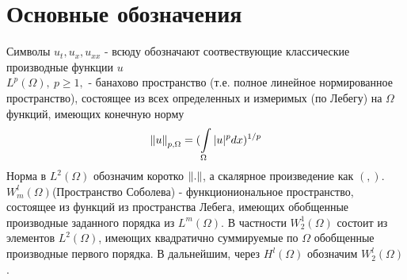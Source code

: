 \section*{Основные обозначения}
\vspace{1em}

Символы $u_t, u_x, u_{xx}$ - всюду обозначают соотвествующие классические
производные функции $u$\\

$L^{p}(\Omega), \ p \ge 1,$ - банахово пространство (т.е. полное линейное
нормированное пространство), состоящее из всех определенных и измеримых (по
Лебегу) на $\Omega$ функций, имеющих конечную норму
\begin{equation}
    \left\lVert u\right\rVert_{p, \Omega} = (\int\limits_{\Omega}{|u|^p dx})^{1/p}
\end{equation}
Норма в $L^2(\Omega)$ обозначим коротко $\left\lVert.\right\rVert$, а скалярное произведение
как $(, )$.\\

$W^l_m(\Omega)$(Пространство Соболева) - функциониональное пространство,
состоящее из функций из пространства Лебега, имеющих обобщенные производные 
заданного порядка из $L^m(\Omega)$. В частности
$W^1_2(\Omega)$ состоит из элементов $L^2(\Omega)$, имеющих квадратично
суммируемые по $\Omega$ обобщенные производные первого порядка. В дальнейшим,
через $H^l(\Omega)$ обозначим $W^l_2(\Omega)$.


